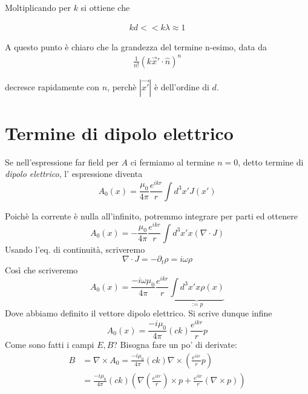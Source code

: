 \documentclass{report}
\begin{document}
\begin{enumerate}
{        Moltiplicando per \(k\) si ottiene che 

        \begin{align}
            kd << k\lambda \approx 1
        \end{align}

        A questo punto è chiaro che la grandezza del termine n-esimo, data da 
        \begin{align}
            \frac{1}{n!}(k \vec{x}' \cdot \hat{n})^n
        \end{align}

        decresce rapidamente con \(n\), perchè \(|\vec{x'}|\) è dell'ordine di \(d\). 
        }
        

        \end{enumerate}

        \section{Termine di dipolo elettrico}
        
            Se nell'espressione far field per $A$ ci fermiamo al termine $n=0$, detto termine di \emph{dipolo elettrico}, l' espressione diventa
            \begin{equation}
                A_0(x) = \frac{\mu_0}{4\pi}\frac{e^{ikr}}{r}\int d^3x' J(x')
            \end{equation}

            Poichè la corrente è nulla all'infinito, potremmo integrare per parti ed ottenere 
            \begin{equation}
                A_0(x) = -\frac{\mu_0}{4\pi}\frac{e^{ikr}}{r}\int d^3x' x (\nabla \cdot J)
            \end{equation}
            Usando l'eq. di continuità, scriveremo 
            \begin{equation}
                \nabla \cdot J = -\partial_t\rho = i\omega \rho
            \end{equation}
            Così che scriveremo 
            \begin{equation}
                A_0(x) = \frac{-i\omega \mu_0}{4\pi}\frac{e^{ikr}}{r}\underbrace{\int d^3x' x \rho(x)}_{:=p}
            \end{equation}
            Dove abbiamo definito il vettore dipolo elettrico. Si scrive dunque infine 
            \begin{equation}
                A_0(x) = \frac{-i\mu_0}{4\pi}(ck)\frac{e^{ikr}}{r}p 
            \end{equation}
            Come sono fatti i campi $E, B$? Bisogna fare un po' di derivate: 
            \begin{align}
                B &= \nabla \times A_0 = \frac{-i\mu_0}{4\pi}(ck) \nabla \times \left( \frac{e^{ikr}}{r}p\right) \\
                &= \frac{-i\mu_0}{4\pi}(ck) \left(\nabla\left(\frac{e^{ikr}}{r}\right)\times p + \frac{e^{ikr}}{r}(\nabla \times p) \right)
            \end{align}
\end{document}
